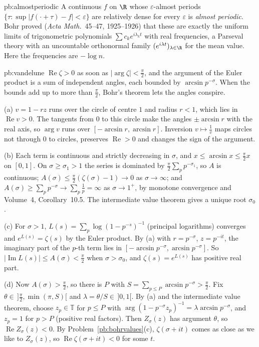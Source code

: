 \begin{solution}{pb:almostperiodic}
\leads A continuous $f$ on $\R$ whose $\varepsilon$-almost periods $\{\tau:\sup|f(\cdot+\tau)-f|<\varepsilon\}$ are relatively dense for every $\varepsilon$ is \emph{almost periodic}. Bohr proved
(\emph{Acta Math.}\ 45--47, 1925--1926) that these are exactly the uniform limits of trigonometric polynomials $\sum c_ke^{i\lambda_kt}$ with real frequencies, a Parseval theory with an
uncountable orthonormal family $(e^{i\lambda t})_{\lambda\in\R}$ for the mean value. Here the frequencies are $-\log n$.
\end{solution}

\begin{solution}{pb:vandelune}
\idea $\operatorname{Re}\zeta>0$ as soon as $|\arg\zeta|<\frac\pi2$, and the argument of the Euler product is a sum of independent angles, each bounded by $\arcsin p^{-\sigma}$. When the
bounds add up to more than $\frac\pi2$, Bohr's theorem lets the angles conspire.

\writeup (a) $v=1-rz$ runs over the circle of centre $1$ and radius $r<1$, which lies in $\operatorname{Re}v>0$. The tangents from $0$ to this circle make the angles $\pm\arcsin r$ with
the real axis, so $\arg v$ runs over $[-\arcsin r,\arcsin r]$. Inversion $v\mapsto\frac1v$ maps circles not through $0$ to circles, preserves $\operatorname{Re}>0$ and changes the sign of
the argument.

(b) Each term is continuous and strictly decreasing in $\sigma$, and $x\le\arcsin x\le\frac\pi2x$ on $[0,1]$. On $\sigma\ge\sigma_1>1$ the series is dominated by $\frac\pi2\sum_pp^{-\sigma_1}$, so $A$
is continuous; $A(\sigma)\le\frac\pi2(\zeta(\sigma)-1)\to0$ as $\sigma\to\infty$; and $A(\sigma)\ge\sum_pp^{-\sigma}\to\sum_p\frac1p=\infty$ as $\sigma\to1^+$, by monotone convergence and Volume~4,
Corollary~10.5. The intermediate value theorem gives a unique root $\sigma_0$.

(c) For $\sigma>1$, $L(s)=\sum_p\log(1-p^{-s})^{-1}$ (principal logarithms) converges and $e^{L(s)}=\zeta(s)$ by the Euler product. By (a) with $r=p^{-\sigma}$, $z=p^{-it}$, the imaginary part of the
$p$-th term lies in $[-\arcsin p^{-\sigma},\arcsin p^{-\sigma}]$. So $|\operatorname{Im}L(s)|\le A(\sigma)<\frac\pi2$ when $\sigma>\sigma_0$, and $\zeta(s)=e^{L(s)}$ has positive real part.

(d) Now $A(\sigma)>\frac\pi2$, so there is $P$ with $S=\sum_{p\le P}\arcsin p^{-\sigma}>\frac\pi2$. Fix $\theta\in\,]\frac\pi2,\min(\pi,S)[$ and $\lambda=\theta/S\in\,]0,1[$. By (a) and the intermediate
value theorem, choose $z_p\in\mathbb T$ for $p\le P$ with $\arg(1-p^{-\sigma}z_p)^{-1}=\lambda\arcsin p^{-\sigma}$, and $z_p=1$ for $p>P$ (positive real factors). Then $Z_\sigma(z)$ has argument
$\theta$, so $\operatorname{Re}Z_\sigma(z)<0$. By Problem~\ref{pb:bohrvalues}(c), $\zeta(\sigma+it)$ comes as close as we like to $Z_\sigma(z)$, so $\operatorname{Re}\zeta(\sigma+it)<0$ for some $t$.


\end{solution}
